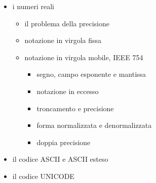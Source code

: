 \begin{itemize}
\item  i numeri reali
    \begin{itemize}
    \item il problema della precisione
    \item notazione in virgola fissa
    \item notazione in virgola mobile, IEEE 754
    	\begin{itemize}
    	\item segno, campo esponente e mantissa
    	\item notazione in eccesso
    	\item troncamento e precisione
    	\item forma normalizzata e denormalizzata
	   \item doppia precisione
    	\end{itemize}	
    \end{itemize}
\item  il codice ASCII e ASCII esteso
\item  il codice UNICODE
\end{itemize}

\mysep{}

